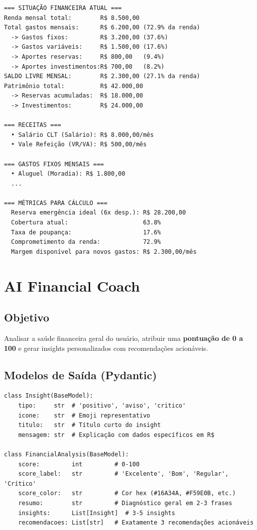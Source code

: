 \documentclass[12pt, a4paper, oneside]{report}
\begin{document}
\begin{lstlisting}[style=python, caption={Estrutura do contexto financeiro enviado ao LLM}]
=== SITUAÇÃO FINANCEIRA ATUAL ===
Renda mensal total:        R$ 8.500,00
Total gastos mensais:      R$ 6.200,00 (72.9% da renda)
  -> Gastos fixos:         R$ 3.200,00 (37.6%)
  -> Gastos variáveis:     R$ 1.500,00 (17.6%)
  -> Aportes reservas:     R$ 800,00   (9.4%)
  -> Aportes investimentos:R$ 700,00   (8.2%)
SALDO LIVRE MENSAL:        R$ 2.300,00 (27.1% da renda)
Patrimônio total:          R$ 42.000,00
  -> Reservas acumuladas:  R$ 18.000,00
  -> Investimentos:        R$ 24.000,00

=== RECEITAS ===
  • Salário CLT (Salário): R$ 8.000,00/mês
  • Vale Refeição (VR/VA): R$ 500,00/mês

=== GASTOS FIXOS MENSAIS ===
  • Aluguel (Moradia): R$ 1.800,00
  ...

=== MÉTRICAS PARA CÁLCULO ===
  Reserva emergência ideal (6x desp.): R$ 28.200,00
  Cobertura atual:                     63.8%
  Taxa de poupança:                    17.6%
  Comprometimento da renda:            72.9%
  Margem disponível para novos gastos: R$ 2.300,00/mês
\end{lstlisting}

\section{AI Financial Coach}

\subsection{Objetivo}

Analisar a saúde financeira geral do usuário, atribuir uma \textbf{pontuação de 0 a 100} e gerar insights personalizados com recomendações acionáveis.

\subsection{Modelos de Saída (Pydantic)}

\begin{lstlisting}[style=python, caption={finance/ai\_coach.py — Modelos Pydantic}]
class Insight(BaseModel):
    tipo:     str  # 'positivo', 'aviso', 'critico'
    icone:    str  # Emoji representativo
    titulo:   str  # Título curto do insight
    mensagem: str  # Explicação com dados específicos em R$

class FinancialAnalysis(BaseModel):
    score:         int         # 0-100
    score_label:   str         # 'Excelente', 'Bom', 'Regular', 'Crítico'
    score_color:   str         # Cor hex (#16A34A, #F59E0B, etc.)
    resumo:        str         # Diagnóstico geral em 2-3 frases
    insights:      List[Insight]  # 3-5 insights
    recomendacoes: List[str]   # Exatamente 3 recomendações acionáveis
\end{lstlisting}
\end{document}

